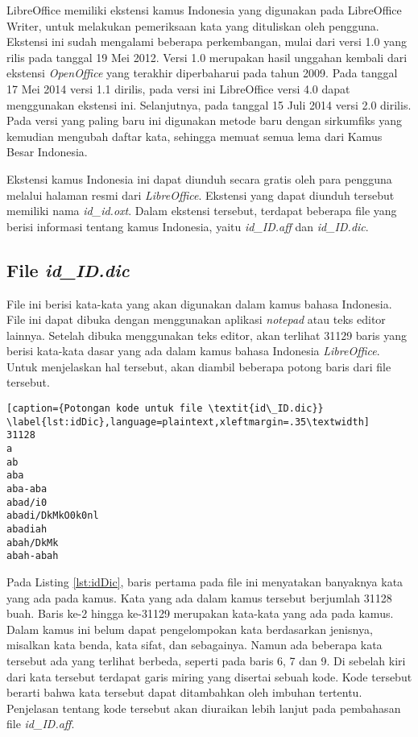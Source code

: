 LibreOffice memiliki ekstensi kamus Indonesia yang digunakan pada LibreOffice Writer, untuk melakukan pemeriksaan kata yang dituliskan oleh pengguna. Ekstensi ini sudah mengalami beberapa perkembangan, mulai dari versi 1.0 yang rilis pada tanggal 19 Mei 2012. Versi 1.0 merupakan hasil unggahan kembali dari ekstensi \textit{OpenOffice} yang terakhir diperbaharui pada tahun 2009. Pada tanggal 17 Mei 2014 versi 1.1 dirilis, pada versi ini LibreOffice versi 4.0 dapat menggunakan ekstensi ini. Selanjutnya, pada tanggal 15 Juli 2014 versi 2.0 dirilis. Pada versi yang paling baru ini digunakan metode baru dengan sirkumfiks yang kemudian mengubah daftar kata, sehingga memuat semua lema dari Kamus Besar Indonesia.

Ekstensi kamus Indonesia ini dapat diunduh secara gratis oleh para pengguna melalui halaman resmi dari \textit{LibreOffice}. Ekstensi yang dapat diunduh tersebut memiliki nama \textit{id\_id.oxt}. Dalam ekstensi tersebut, terdapat beberapa file yang berisi informasi tentang kamus Indonesia, yaitu \textit{id\_ID.aff} dan \textit{id\_ID.dic}.

\subsection{File \textit{id\_ID.dic}}

File ini berisi kata-kata yang akan digunakan dalam kamus bahasa Indonesia. File ini dapat dibuka dengan menggunakan aplikasi \textit{notepad} atau teks editor lainnya. Setelah dibuka menggunakan teks editor, akan terlihat 31129 baris yang berisi kata-kata dasar yang ada dalam kamus bahasa Indonesia \textit{LibreOffice}. Untuk menjelaskan hal tersebut, akan diambil beberapa potong baris dari file tersebut.
	
	\begin{lstlisting}[caption={Potongan kode untuk file \textit{id\_ID.dic}}			\label{lst:idDic},language=plaintext,xleftmargin=.35\textwidth] 
31128
a
ab
aba
aba-aba
abad/i0
abadi/DkMkO0k0nl
abadiah
abah/DkMk
abah-abah
	\end{lstlisting}
\medskip
	
Pada Listing \ref{lst:idDic}, baris pertama pada file ini menyatakan banyaknya kata yang ada pada kamus. Kata yang ada dalam kamus tersebut berjumlah 31128 buah. Baris ke-2 hingga ke-31129 merupakan kata-kata yang ada pada kamus. Dalam kamus ini belum dapat pengelompokan kata berdasarkan jenisnya, misalkan kata benda, kata sifat, dan sebagainya. Namun ada beberapa kata tersebut ada yang terlihat berbeda, seperti pada baris 6, 7 dan 9. Di sebelah kiri dari kata tersebut terdapat garis miring yang disertai sebuah kode. Kode tersebut berarti bahwa kata tersebut dapat ditambahkan oleh imbuhan tertentu. Penjelasan tentang kode tersebut akan diuraikan lebih lanjut pada pembahasan file \textit{id\_ID.aff}. 

